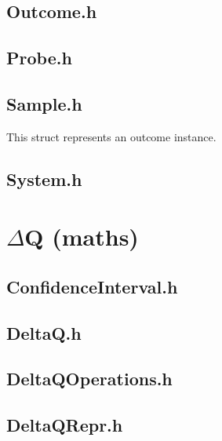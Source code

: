 \subsection{Outcome.h}


\subsection{Probe.h}


\subsection{Sample.h}
This struct represents an outcome instance.


\subsection{System.h}


\section{$\Delta$Q (maths)}

\subsection{ConfidenceInterval.h}


\subsection{DeltaQ.h}


\subsection{DeltaQOperations.h}


\subsection{DeltaQRepr.h}


